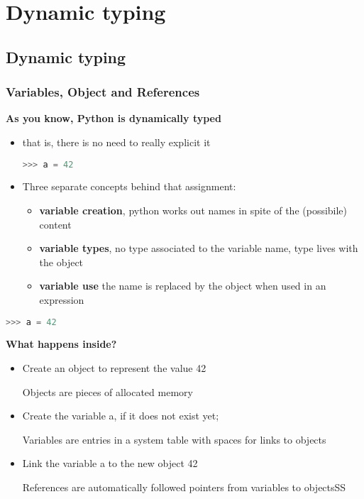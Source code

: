 \section{Dynamic typing}

\subsection{Dynamic typing}

\subsubsection{Variables, Object and References}

\textbf{As you know, Python is dynamically typed}
\begin{itemize}
	\item that is, there is no need to really explicit it
	\begin{lstlisting}[language=Python]
	>>> a = 42
	\end{lstlisting}
	\item Three separate concepts behind that assignment:
	\begin{itemize}
		\item \textbf{variable creation}, python works out names in spite of the (possibile) content
		\item \textbf{variable types}, no type associated to the variable name, type lives with the object
		\item \textbf{variable use} the name is replaced by the object when used in an expression
	\end{itemize}
\end{itemize}

\begin{lstlisting}[language=Python]
>>> a = 42
\end{lstlisting}
	
\textbf{What happens inside?}
\begin{itemize}
	\item Create an object to represent the value 42
	
	Objects are pieces of allocated memory
	
	\item Create the variable a, if it does not exist yet;
	
	Variables  are entries in a system table with spaces for links to objects
	
	\item Link the variable a to the new object 42
	
	References are automatically followed pointers from variables to objectsSS
\end{itemize}

